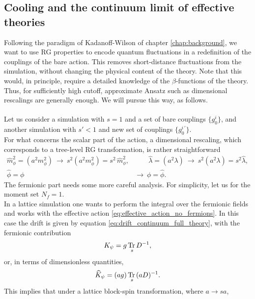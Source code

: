\subsection{Cooling and the continuum limit of effective theories}
Following the paradigm of Kadanoff-Wilson of chapter \ref{chap:background}, we want to use RG properties to encode quantum fluctuations in a redefinition of the couplings of the bare action. This removes short-distance fluctuations from the simulation, without changing the physical content of the theory. Note that this would, in principle, require a detailed knowledge of 
the $\beta$-functions of the theory. Thus, for sufficiently high cutoff, approximate Ansatz such as dimensional rescalings are generally enough. We will pursue this way, as follows. \\~\\
Let us consider a simulation with $s=1$ and a set of bare couplings $\{g^i_0\}$, and another simulation with $s'<1$ and new set of couplings $\{g^{i \, \prime}_0\}$. \\
For what concerns the scalar part of the action, a dimensional rescaling, which corresponds to a tree-level RG transformation, is rather straightforward
\begin{equation*}
    \begin{aligned}
    \hat{m}_\phi^2 = (a^2m_\phi^2) \ \to \ s^2(a^2m_\phi^2) = s^2 \, \hat{m}_\phi^2, &\qquad \hat{\lambda} = (a^2\lambda) \ \to  \ s^2 (a^2\lambda) = s^2\hat{\lambda}, \\
    \hat\phi = \phi \ &\to \ \phi = \hat\phi.
    \end{aligned}
\end{equation*}
The fermionic part needs some more careful analysis. For simplicity, let us for the moment set $N_f = 1$. \\
In a lattice simulation one wants to perform the integral over the fermionic fields and works with the effective action \eqref{eq:effective_action_no_fermions}. In this case the drift is given by equation \eqref{eq:drift_continuum_full_theory}, with the fermionic contribution
\begin{equation}
    	K_{\psi} = g \, \underset{s}{\operatorname{\text{Tr} \,}}{D^{-1}},
	\label{eq:fermionic_drift_contribution}
\end{equation}
or, in terms of dimensionless quantities,
\begin{equation*}
    \widehat{K}_{\psi} = (ag) \, \underset{s}{\operatorname{\text{Tr} \,}}{(aD)^{-1}}.
\end{equation*}
This implies that under a lattice block-spin transformation, where $a \to sa$,
